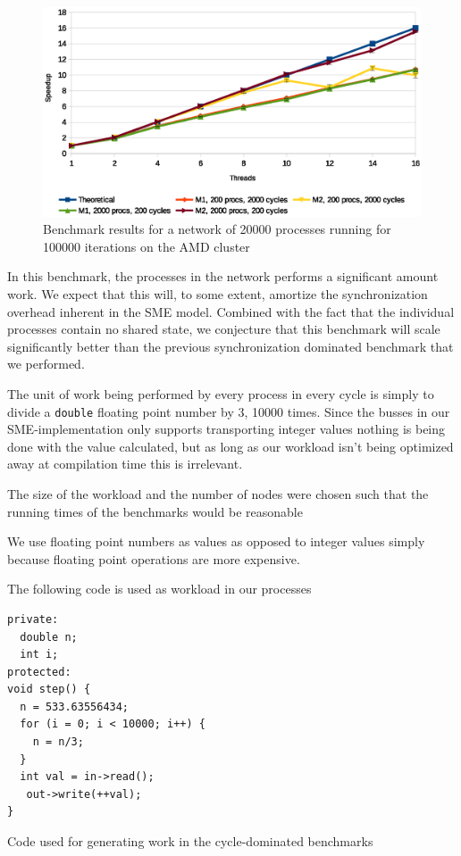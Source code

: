 \begin{figure}
\centering
\includegraphics[width=\textwidth]{graphs/heavy-ring2}
\caption[Synchronization-dominated benchmark on AMD cluster]{Benchmark results for a network of 20000 processes running
for 100000 iterations on the AMD cluster}
\label{fig:heavy-ring}
\end{figure}


In this benchmark, the processes in the network performs a significant
amount work. We expect that this will, to some extent, amortize the
synchronization overhead inherent in the SME model. Combined with the
fact that the individual processes contain no shared state, we
conjecture that this benchmark will scale significantly better
than the previous synchronization dominated benchmark that we
performed.

The unit of work being performed by every process in every cycle is
simply to divide a \texttt{double} floating point number by 3, 10000
times. Since the busses in our SME-implementation only supports
transporting integer values nothing is being done with the value calculated,
but as long as our workload isn't being optimized away at compilation
time this is irrelevant.

The size of the workload and the number of nodes were chosen such that
the running times of the benchmarks would be reasonable 

We use floating point numbers as values as opposed to integer values
simply because floating point operations are more expensive.

The following code is used as workload in our processes

\begin{listing}[H]
\begin{verbatim}
private:
  double n;
  int i;
protected:
void step() {
  n = 533.63556434;
  for (i = 0; i < 10000; i++) {
    n = n/3;
  }
  int val = in->read();
   out->write(++val);
}
\end{verbatim}
\caption{Code used for generating work in the cycle-dominated
  benchmarks}
\label{lst:cyclecode}
\end{listing}



